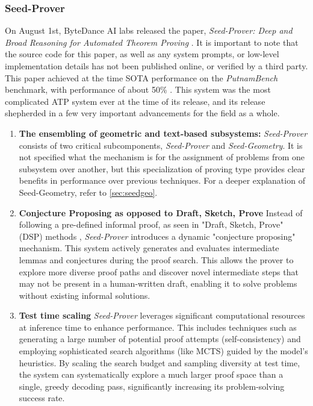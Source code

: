 \documentclass[12pt, letterpaper]{article}
\begin{document}
\subsubsection{Seed-Prover}
On August 1st, ByteDance AI labs released the paper, \textit{Seed-Prover: Deep and Broad Reasoning for
Automated Theorem Proving} \citet{chen2025seedproverdeepbroadreasoning}. It is important to note that the source code for this paper, as well as any system prompts, or low-level implementation details has not been published online, or verified by a third party. This paper achieved at the time SOTA performance on the \textit{PutnamBench} benchmark, with performance of about 50\% \citet{chen2025seedproverdeepbroadreasoning}. This system was the most complicated ATP system ever at the time of its release, and its release shepherded in a few very important advancements for the field as a whole. 
\begin{enumerate}
    \item \textbf{The ensembling of geometric and text-based subsystems:} 
    \textit{Seed-Prover} consists of two critical subcomponents, \textit{Seed-Prover} and \textit{Seed-Geometry}. It is not specified what the mechanism is for the assignment of problems from one subsystem over another, but this specialization of proving type provides clear benefits in performance over previous techniques. For a deeper explanation of Seed-Geometry, refer to \autoref{sec:seedgeo}. \citet{chen2025seedproverdeepbroadreasoning}
    \item \textbf{Conjecture Proposing as opposed to Draft, Sketch, Prove}
    Instead of following a pre-defined informal proof, as seen in "Draft, Sketch, Prove" (DSP) methods \citet{jiang2023draftsketchproveguiding}, \textit{Seed-Prover} introduces a dynamic "conjecture proposing" mechanism. This system actively generates and evaluates intermediate lemmas and conjectures during the proof search. This allows the prover to explore more diverse proof paths and discover novel intermediate steps that may not be present in a human-written draft, enabling it to solve problems without existing informal solutions. \citet{chen2025seedproverdeepbroadreasoning}

    \item \textbf{Test time scaling}
    \textit{Seed-Prover} leverages significant computational resources at inference time to enhance performance. This includes techniques such as generating a large number of potential proof attempts (self-consistency) and employing sophisticated search algorithms (like MCTS) guided by the model's heuristics. By scaling the search budget and sampling diversity at test time, the system can systematically explore a much larger proof space than a single, greedy decoding pass, significantly increasing its problem-solving success rate. \citet{chen2025seedproverdeepbroadreasoning}
\end{enumerate}
\end{document}
